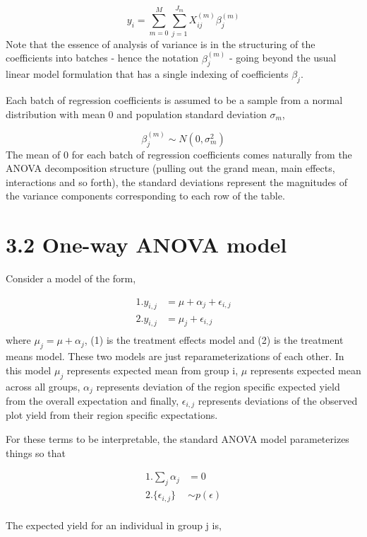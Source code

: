 \documentclass[12pt,]{article}
\begin{document}
\[y_i = \sum_{m=0}^M\sum_{j=1}^{J_m} X_{ij}^{(m)} \beta_j^{(m)} \] Note
that the essence of analysis of variance is in the structuring of the
coefficients into batches - hence the notation \(\beta_j^{(m)}\) - going
beyond the usual linear model formulation that has a single indexing of
coefficients \(\beta_j\).

Each batch of regression coefficients is assumed to be a sample from a
normal distribution with mean 0 and population standard deviation
\(\sigma_m\),

\[\beta_j^{(m)}\sim N(0, \sigma^2_m)\] The mean of 0 for each batch of
regression coefficients comes naturally from the ANOVA decomposition
structure (pulling out the grand mean, main effects, interactions and so
forth), the standard deviations represent the magnitudes of the variance
components corresponding to each row of the table.

\section{3.2 One-way ANOVA model}\label{one-way-anova-model}

Consider a model of the form,

\[
\begin{aligned}
1. y_{i,j} &= \mu + \alpha_j + \epsilon_{i,j}\\
2. y_{i,j} &= \mu_j + \epsilon_{i,j}\\
\end{aligned}
\] where \(\mu_j = \mu + \alpha_j\), (1) is the treatment effects model
and (2) is the treatment means model. These two models are just
reparameterizations of each other. In this model \(\mu_j\) represents
expected mean from group i, \(\mu\) represents expected mean across all
groups, \(\alpha_j\) represents deviation of the region specific
expected yield from the overall expectation and finally,
\(\epsilon_{i,j}\) represents deviations of the observed plot yield from
their region specific expectations.

For these terms to be interpretable, the standard ANOVA model
parameterizes things so that

\[
\begin{aligned}
1. \sum_j \alpha_j &= 0 \\
2. \{\epsilon_{i,j}\} &\sim p(\epsilon) \\
\end{aligned}
\]

The expected yield for an individual in group j is,
\end{document}
